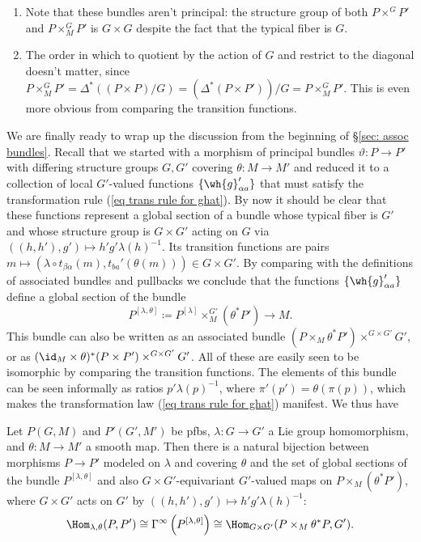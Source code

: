 \begin{rem}
\begin{enumerate}
    \item Note that these bundles aren't principal: the structure group of both $P\times^G P'$ and $P\times^G_MP'$ is $G\times G$ despite the fact that the typical fiber is $G$.
    \item The order in which to quotient by the action of $G$ and restrict to the diagonal doesn't matter, since $P\times^G_MP'=\Delta^\ast((P\times P)\slash G)=(\Delta^\ast(P\times P'))\slash G=P\times^G_M P'$. This is even more obvious from comparing the transition functions.
\end{enumerate}
\end{rem}


We are finally ready to wrap up the discussion from the beginning of \S\ref{sec: assoc bundles}. Recall that we started with a morphism of principal bundles $\vartheta:P\to P'$ with differing structure groups $G,G'$ covering $\theta:M\to M'$ and reduced it to a collection of local $G'$-valued functions $\{\wh{g}_{\alpha a}'\}$ that must satisfy the transformation rule (\ref{eq trans rule for ghat}). By now it should be clear that these functions represent a global section of a bundle whose typical fiber is $G'$ and whose structure group is $G\times G'$ acting on $G$ via $((h,h'),g')\mapsto h'g'\lambda(h)^{-1}$. Its transition functions are pairs $m\mapsto (\lambda\circ t_{\beta\alpha}(m),t_{ba}'(\theta(m)))\in G\times G'$. By comparing with the definitions of associated bundles and pullbacks we conclude that the functions $\{\wh{g}_{\alpha a}'\}$ define a global section of the bundle
\[\boxed{P^{[\lambda,\theta]}\coloneqq P^{[\lambda]}\times^{G'}_M(\theta^\ast P')\to M.}\]
This bundle can also be written as an associated bundle $(P\times_M \theta^\ast P')\times^{G\times G'} G'$, or as $(\id_M\times \theta)^\ast(P\times P')\times^{G\times G'}G'$. All of these are easily seen to be isomorphic by comparing the transition functions. The elements of this bundle can be seen informally as ratios $p'\lambda(p)^{-1}$, where $\pi'(p')=\theta(\pi(p))$, which makes the transformation law (\ref{eq trans rule for ghat}) manifest. We thus have
\begin{prop}\label{prop pfb morphisms}
    Let $P(G,M)$ and $P'(G',M')$ be \glspl{pfb}, $\lambda:G\to G'$ a Lie group homomorphism, and $\theta:M\to M'$ a smooth map. Then there is a natural bijection between morphisms $P\to P'$ modeled on $\lambda$ and covering $\theta$ and the set of global sections of the bundle $P^{[\lambda,\theta]}$ and also $G\times G'$-equivariant $G'$-valued maps on $P\times_M (\theta^\ast P')$, where $G\times G'$ acts on $G'$ by $((h,h'),g')\mapsto h'g'\lambda(h)^{-1}$:
    \[\Hom_{\lambda,\theta}(P,P')\cong \Gamma^\infty\left(P^{[\lambda,\theta]}\right)\cong \Hom_{G\times G'}(P\times_M \theta^\ast P,G').\]
\end{prop}


